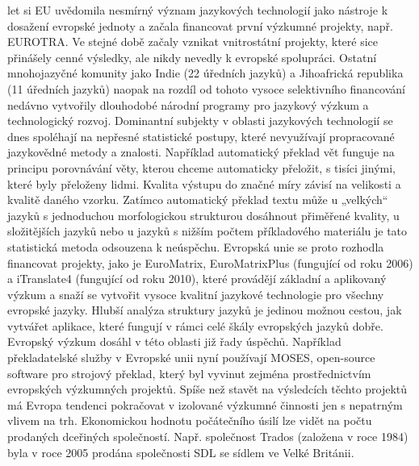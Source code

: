 \begin{multicols}{2}

let si EU uvědomila nesmírný význam jazykových technologií jako nástroje k dosažení evropské jednoty a začala financovat první výzkumné projekty, např. EUROTRA. Ve stejné době začaly vznikat vnitrostátní projekty, které sice přinášely cenné výsledky, ale nikdy nevedly k evropské spolupráci. Ostatní mnohojazyčné komunity jako Indie (22 úředních jazyků) a Jihoafrická republika (11 úředních jazyků) naopak na rozdíl od tohoto vysoce selektivního financování nedávno vytvořily dlouhodobé národní programy pro jazykový výzkum a technologický rozvoj. Dominantní subjekty v oblasti jazykových technologií se dnes spoléhají na nepřesné statistické postupy, které nevyužívají propracované jazykovědné metody a znalosti. Například automatický překlad vět funguje na principu porovnávání věty, kterou chceme automaticky přeložit, s tisíci jinými, které byly přeloženy lidmi. Kvalita výstupu do značné míry závisí na velikosti a kvalitě daného vzorku. Zatímco automatický překlad textu může u „velkých“ jazyků s jednoduchou morfologickou strukturou dosáhnout přiměřené kvality, u složitějších jazyků nebo u jazyků s nižším počtem příkladového materiálu je tato statistická metoda odsouzena k neúspěchu.
Evropská unie se proto rozhodla financovat projekty, jako je EuroMatrix, EuroMatrixPlus (fungující od roku 2006) a iTranslate4 (fungující od roku 2010), které provádějí základní a aplikovaný výzkum a snaží se vytvořit vysoce kvalitní jazykové technologie pro všechny evropské jazyky. Hlubší analýza struktury jazyků je jedinou možnou cestou, jak vytvářet aplikace, které fungují v rámci celé škály evropských jazyků dobře.
Evropský výzkum dosáhl v této oblasti již řady úspěchů. Například překladatelské služby v Evropské unii nyní používají MOSES, open-source software pro strojový překlad, který byl vyvinut zejména prostřednictvím evropských výzkumných projektů. Spíše než stavět na výsledcích těchto projektů má Evropa tendenci pokračovat v izolované výzkumné činnosti jen s nepatrným vlivem na trh. Ekonomickou hodnotu počátečního úsilí lze vidět na počtu prodaných dceřiných společností. Např. společnost Trados (založena v roce 1984) byla v roce 2005 prodána společnosti SDL se sídlem ve Velké Británii.



\end{multicols}
